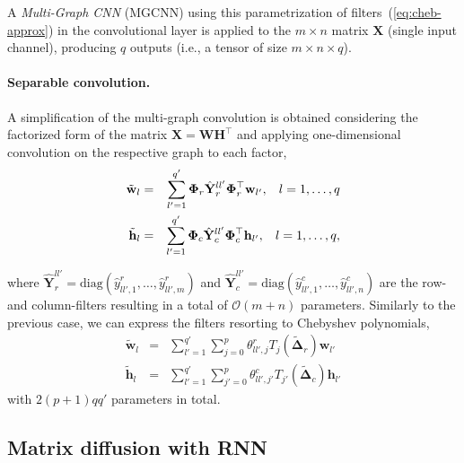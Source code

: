 \documentclass{article}
\begin{document}
A {\em Multi-Graph CNN} (MGCNN) using this parametrization of filters~(\ref{eq:cheb-approx}) in the convolutional layer is applied to the $m\times n$ matrix $\mathbf{X}$ (single input channel), producing $q$ outputs (i.e., a tensor of size $m\times n \times q$). 


\paragraph*{Separable convolution. } 
A simplification of the multi-graph convolution is obtained considering the factorized form of the matrix $\mathbf{X} = \mathbf{W}\mathbf{H}^\top$ and applying one-dimensional convolution on the respective graph to each factor, 
\begin{eqnarray}
\tilde{\mathbf{w}}_{l} &=& \sum_{l'=1}^{q'} \boldsymbol{\Phi}_r \hat{\mathbf{Y}}_r^{ll'} \boldsymbol{\Phi}_r^\top{\mathbf{w}}_{l'}, \hspace{3mm} l = 1,\hdots, q\\
\tilde{\mathbf{h}}_{l} &=& \sum_{l'=1}^{q'} \boldsymbol{\Phi}_c \hat{\mathbf{Y}}_c^{ll'} \boldsymbol{\Phi}_c^\top{\mathbf{h}}_{l'}, \hspace{3mm} l = 1,\hdots, q,
\end{eqnarray}

where $\hat{\mathbf{Y}}_r^{ll'} = \mathrm{diag}(\hat{y}^r_{ll',1}, \hdots, \hat{y}^r_{ll',m})$ and $\hat{\mathbf{Y}}_c^{ll'} = \mathrm{diag}(\hat{y}^c_{ll',1}, \hdots, \hat{y}^c_{ll',n})$ are the row- and column-filters resulting in a total of $\mathcal{O}(m+n)$ parameters. 
Similarly to the previous case, we can express the filters resorting to Chebyshev polynomials, 
\begin{eqnarray}
\tilde{\mathbf{w}}_{l} &=& \sum_{l'=1}^{q'} \sum_{j=0}^p \theta_{ll', j}^r T_{j}(\tilde{\boldsymbol{\Delta}}_r) \mathbf{w}_{l'}\\
\tilde{\mathbf{h}}_{l} &=& \sum_{l'=1}^{q'} \sum_{j'=0}^p \theta_{ll', j'}^c T_{j'}(\tilde{\boldsymbol{\Delta}}_c) \mathbf{h}_{l'}
\label{eq:cheb-approxs}
\end{eqnarray}
with $2(p+1)qq'$ parameters in total. 










 
\subsection{Matrix diffusion with RNN}
\end{document}
